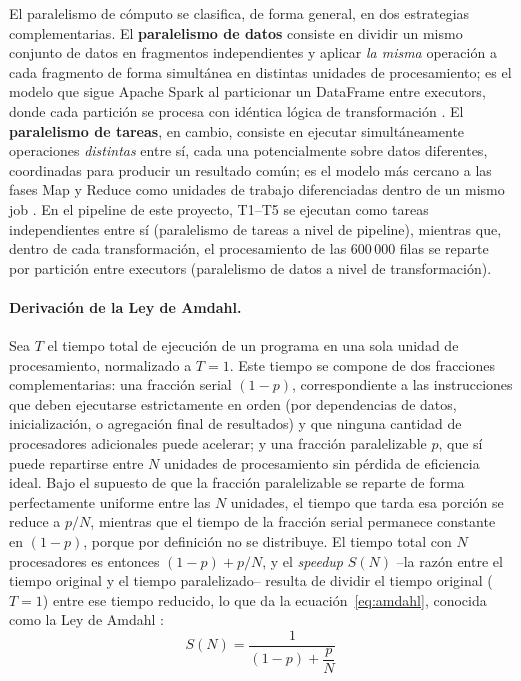 \documentclass[11pt,a4paper]{article}
\begin{document}
El paralelismo de c\'omputo se clasifica, de forma general, en dos
estrategias complementarias. El \textbf{paralelismo de datos} consiste en
dividir un mismo conjunto de datos en fragmentos independientes y aplicar
\emph{la misma} operaci\'on a cada fragmento de forma simult\'anea en
distintas unidades de procesamiento; es el modelo que sigue Apache Spark al
particionar un DataFrame entre executors, donde cada partici\'on se procesa
con id\'entica l\'ogica de transformaci\'on \cite{zaharia2012,chambers2018}.
El \textbf{paralelismo de tareas}, en cambio, consiste en ejecutar
simult\'aneamente operaciones \emph{distintas} entre s\'i, cada una
potencialmente sobre datos diferentes, coordinadas para producir un resultado
com\'un; es el modelo m\'as cercano a las fases Map y Reduce como unidades de
trabajo diferenciadas dentro de un mismo job \cite{dean2008,white2015}. En el
pipeline de este proyecto, T1--T5 se ejecutan como tareas independientes
entre s\'i (paralelismo de tareas a nivel de pipeline), mientras que, dentro
de cada transformaci\'on, el procesamiento de las 600\,000 filas se reparte
por partici\'on entre executors (paralelismo de datos a nivel de
transformaci\'on).

\paragraph{Derivaci\'on de la Ley de Amdahl.}
Sea $T$ el tiempo total de ejecuci\'on de un programa en una sola unidad de
procesamiento, normalizado a $T=1$. Este tiempo se compone de dos fracciones
complementarias: una fracci\'on serial $(1-p)$, correspondiente a las
instrucciones que deben ejecutarse estrictamente en orden (por dependencias
de datos, inicializaci\'on, o agregaci\'on final de resultados) y que ninguna
cantidad de procesadores adicionales puede acelerar; y una fracci\'on
paralelizable $p$, que s\'i puede repartirse entre $N$ unidades de
procesamiento sin p\'erdida de eficiencia ideal. Bajo el supuesto de que la
fracci\'on paralelizable se reparte de forma perfectamente uniforme entre las
$N$ unidades, el tiempo que tarda esa porci\'on se reduce a $p/N$, mientras
que el tiempo de la fracci\'on serial permanece constante en $(1-p)$, porque
por definici\'on no se distribuye. El tiempo total con $N$ procesadores es
entonces $(1-p)+p/N$, y el \emph{speedup} $S(N)$ --la raz\'on entre el tiempo
original y el tiempo paralelizado-- resulta de dividir el tiempo original
($T=1$) entre ese tiempo reducido, lo que da la ecuaci\'on~\eqref{eq:amdahl},
conocida como la Ley de Amdahl \cite{amdahl1967,gustafson1988}:
\begin{equation}
S(N) = \frac{1}{(1-p) + \dfrac{p}{N}}
\label{eq:amdahl}
\end{equation}
\end{document}
